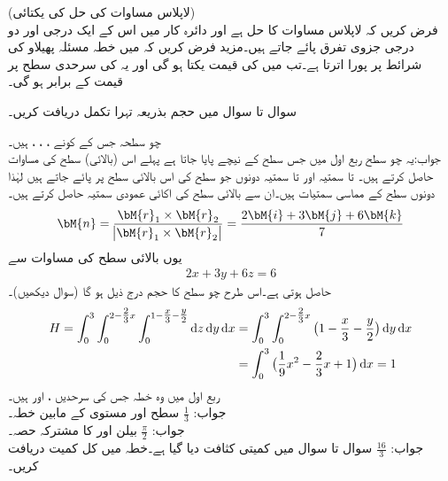 \quad (لاپلاس مساوات کی حل کی یکتائی)\\
فرض کریں کہ  لاپلاس مساوات کا حل ہے اور دائرہ کار  میں اس کے ایک درجی اور دو درجی جزوی تفرق پائے جاتے ہیں۔مزید فرض کریں کہ  میں خطہ   مسئلہ پھیلاو کی شرائط پر پورا اترتا ہے۔تب  میں  کی قیمت یکتا ہو گی اور یہ  کی سرحدی سطح  پر قیمت کے برابر ہو گی۔

سوال  تا سوال  میں حجم بذریعہ تہرا تکمل دریافت کریں۔

\quad چو سطحہ جس کے کونے ، ، ،  ہیں۔\\
جواب:\quad یہ چو سطح ربع اول میں جس سطح  کے نیچے پایا جاتا ہے پہلے اس (بالائی) سطح کی مساوات حاصل کرتے ہیں۔  تا  سمتیہ  اور  تا  سمتیہ  دونوں جو سطح کی اس بالائی سطح پر پائے جاتے ہیں لہٰذا دونوں سطح کے مماسی سمتیات ہیں۔ان سے بالائی سطح کی اکائی عمودی سمتیہ  حاصل کرتے ہیں۔
\begin{align*}
\bM{n}=\frac{\bM{r}_1\times \bM{r}_2}{\abs{\bM{r}_1\times \bM{r}_2}}=\frac{2\bM{i}+3\bM{j}+6\bM{k}}{7}
\end{align*}
یوں بالائی سطح کی مساوات  سے
\begin{align*}
2x+3y+6z=6
\end{align*}
حاصل ہوتی ہے۔اس طرح چو سطح کا حجم درج ذیل ہو گا (سوال  دیکھیں)۔
\begin{align*}
H=\int_0^3\int_0^{2-\tfrac{2}{3}x}\int_0^{1-\tfrac{x}{3}-\tfrac{y}{2}} \dif z\dif y\dif x&=\int_0^3\int_0^{2-\tfrac{2}{3}x}\big(1-\frac{x}{3}-\frac{y}{2}\big)\dif y\dif x\\
&=\int_0^3 \big(\frac{1}{9}x^2-\frac{2}{3}x+1\big)\dif x=1
\end{align*}
\quad ربع اول میں وہ خطہ جس کی سرحدیں ،  اور  ہیں۔\\
جواب:\quad 
$\tfrac{1}{3}$
\quad سطح  اور  مستوی  کے مابین خطہ۔\\
جواب:\quad 
$\tfrac{\pi}{2}$
\quad بیلن  اور  کا مشترکہ حصہ۔\\
جواب:\quad 
$\tfrac{16}{3}$
سوال  تا سوال  میں کمیتی کثافت  دیا گیا ہے۔خطہ  میں کل کمیت دریافت کریں۔

